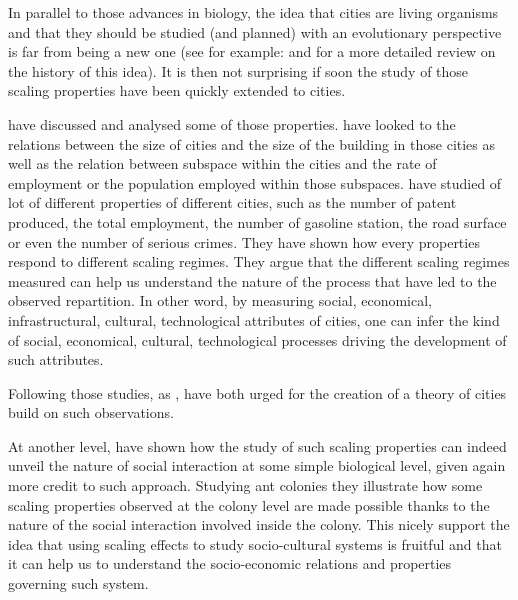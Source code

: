 \documentclass[a4paper,11pt]{article}
\begin{document}
In parallel to those advances in biology, the idea that cities are living organisms and that they should be studied (and planned) with an evolutionary perspective is far from being a new  one (see for example: \cite{geddes1915citiesinevolution} and  \cite{batty2009theevolutionofcitiesgeddesabercrombieandthenewphysicalism} for a more detailed review on the history of this idea). It is then not surprising if soon the study of those scaling properties have been quickly extended to cities.

\cite{batty2008thesizescaleandshapeofcities,bettencourt2007growthinnovationscalingandthepaceoflifeincities} have discussed and analysed some of those properties. \cite{batty2008thesizescaleandshapeofcities} have looked to the relations between the size of cities and the size of the building in those cities as well as the relation between subspace within the cities and the rate of employment or the population employed within those subspaces.
\cite{bettencourt2007growthinnovationscalingandthepaceoflifeincities} have studied of lot of different properties of different cities, such as the number of patent produced, the total employment, the number of gasoline station, the road surface or even the number of serious crimes. They have shown how every properties respond to different scaling regimes.  They argue that the different scaling regimes measured can help us understand the nature of the process that have led to the observed repartition. In other word, by measuring social, economical, infrastructural, cultural, technological attributes of cities, one can infer the kind of social, economical, cultural, technological processes driving the development of such attributes.

Following those studies, \cite{bettencourt2010aunifiedtheoryofurbanliving} as \cite{batty2013theory}, have both urged for the creation of a theory of cities build on such observations.

At another level, \cite{hou2010energeticbasisofcoloniallivinginsocialinsects} have shown how the study of such scaling properties can indeed unveil the nature of social interaction at some simple biological level, given again more credit to such approach.
Studying ant colonies they illustrate how some scaling properties observed at the colony level are made possible thanks to the nature of the social interaction involved inside the colony.
This nicely support the idea that using scaling effects to study socio-cultural systems is fruitful and that it can help us to understand the socio-economic relations and properties governing such system. 
\end{document}
